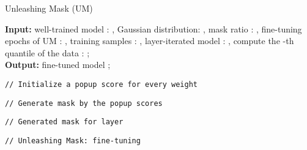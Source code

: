 \documentclass{article}
\theoremstyle{plain}
\theoremstyle{definition}
\theoremstyle{remark}
\begin{document}
\begin{algorithm}[h!]
\caption{Unleashing Mask (UM)}
   \label{alg:um}
   {\bf Input:} well-trained model : , Gaussian distribution: , mask ratio : , fine-tuning epochs of UM : , training samples : , layer-iterated model : , compute the -th quantile of the data  : ;\\
   {\bf Output:} fine-tuned model ;
\begin{algorithmic}[1]
\STATE \begin{footnotesize}\texttt{// Initialize a popup score for every weight}\end{footnotesize}\vspace{2mm}
    \FOR{}
        \STATE {}
    \ENDFOR\vspace{2mm}
\STATE \begin{footnotesize}\texttt{// Generate mask by the popup scores}\end{footnotesize}\vspace{2mm}
    \FOR{}
        \STATE  \begin{footnotesize}\texttt{// Generated mask for layer }\end{footnotesize}
    \ENDFOR\vspace{2mm}
\STATE \begin{footnotesize}\texttt{// Unleashing Mask: fine-tuning}\end{footnotesize}\vspace{2mm}
    \FOR{}
        \STATE 
    \ENDFOR
\end{algorithmic}
\end{algorithm}
\end{document}
